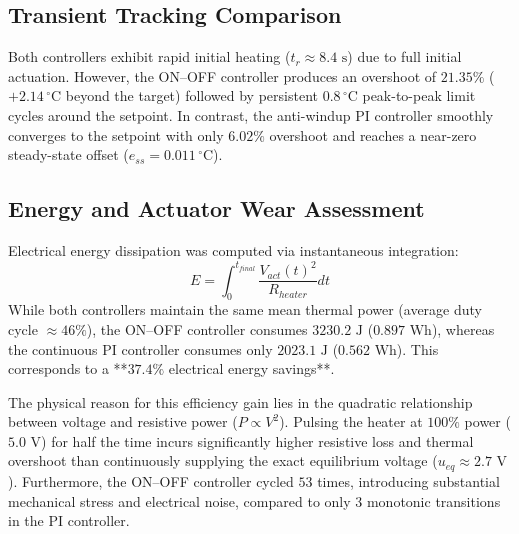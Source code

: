 \documentclass[conference]{IEEEtran}
\begin{document}
\subsection{Transient Tracking Comparison}
Both controllers exhibit rapid initial heating ($t_r \approx 8.4\text{ s}$) due to full initial actuation. However, the ON--OFF controller produces an overshoot of $21.35\%$ ($+2.14\,^\circ\text{C}$ beyond the target) followed by persistent $0.8\,^\circ\text{C}$ peak-to-peak limit cycles around the setpoint. In contrast, the anti-windup PI controller smoothly converges to the setpoint with only $6.02\%$ overshoot and reaches a near-zero steady-state offset ($e_{ss} = 0.011\,^\circ\text{C}$).

\subsection{Energy and Actuator Wear Assessment}
Electrical energy dissipation was computed via instantaneous integration:
\begin{equation}
E = \int_{0}^{t_{final}} \frac{V_{act}(t)^2}{R_{heater}} dt
\end{equation}
While both controllers maintain the same mean thermal power (average duty cycle $\approx 46\%$), the ON--OFF controller consumes $3230.2\text{ J}$ ($0.897\text{ Wh}$), whereas the continuous PI controller consumes only $2023.1\text{ J}$ ($0.562\text{ Wh}$). This corresponds to a **$37.4\%$ electrical energy savings**.

The physical reason for this efficiency gain lies in the quadratic relationship between voltage and resistive power ($P \propto V^2$). Pulsing the heater at $100\%$ power ($5.0\text{ V}$) for half the time incurs significantly higher resistive loss and thermal overshoot than continuously supplying the exact equilibrium voltage ($u_{eq} \approx 2.7\text{ V}$). Furthermore, the ON--OFF controller cycled $53$ times, introducing substantial mechanical stress and electrical noise, compared to only $3$ monotonic transitions in the PI controller.
\end{document}

